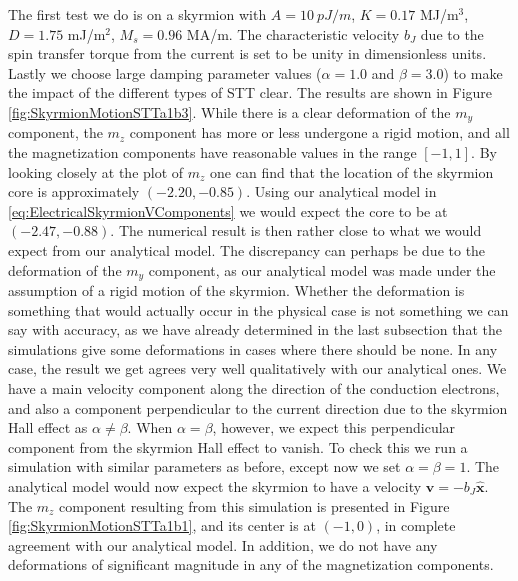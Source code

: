 The first test we do is on a skyrmion with $A=\SI{10}{pJ/m}$, $K=0.17$ MJ/m$^3$, $D=1.75$ mJ/m$^2$, $M_s=0.96$ MA/m. The characteristic velocity $b_J$ due to the spin transfer torque from the current is set to be unity in dimensionless units. Lastly we choose large damping parameter values ($\alpha=1.0$ and $\beta=3.0$) to make the impact of the different types of STT clear. The results are shown in Figure \ref{fig:SkyrmionMotionSTTa1b3}. While there is a clear deformation of the $m_y$ component, the $m_z$ component has more or less undergone a rigid motion, and all the magnetization components have reasonable values in the range $\left[-1,1\right]$. By looking closely at the plot of $m_z$ one can find that the location of the skyrmion core is approximately $\left(-2.20, -0.85\right)$. Using our analytical model in \eqref{eq:ElectricalSkyrmionVComponents} we would expect the core to be at $\left(-2.47, -0.88\right)$. The numerical result is then rather close to what we would expect from our analytical model. The discrepancy can perhaps be due to the deformation of the $m_y$ component, as our analytical model was made under the assumption of a rigid motion of the skyrmion. Whether the deformation is something that would actually occur in the physical case is not something we can say with accuracy, as we have already determined in the last subsection that the simulations give some deformations in cases where there should be none. In any case, the result we get agrees very well qualitatively with our analytical ones. We have a main velocity component along the direction of the conduction electrons, and also a component perpendicular to the current direction due to the skyrmion Hall effect as $\alpha\neq\beta$. When $\alpha=\beta$, however, we expect this perpendicular component from the skyrmion Hall effect to vanish. To check this we run a simulation with similar parameters as before, except now we set $\alpha=\beta=1$. The analytical model would now expect the skyrmion to have a velocity $\mathbold{v}=-b_J\mathbold{\hat{x}}$. The $m_z$ component resulting from this simulation is presented in Figure \ref{fig:SkyrmionMotionSTTa1b1}, and its center is at $\left(-1,0\right)$, in complete agreement with our analytical model. In addition, we do not have any deformations of significant magnitude in any of the magnetization components.
